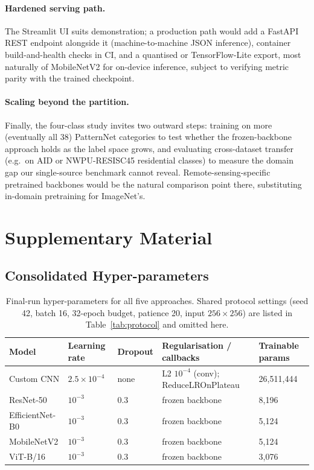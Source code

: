 \documentclass[11pt,twoside,a4paper]{article}
\begin{document}
\paragraph{Hardened serving path.}
The Streamlit UI suits demonstration; a production path would add a FastAPI
REST endpoint alongside it (machine-to-machine JSON inference), container
build-and-health checks in CI, and a quantised or TensorFlow-Lite export,
most naturally of MobileNetV2 for on-device inference, subject to
verifying metric parity with the trained checkpoint.

\paragraph{Scaling beyond the partition.}
Finally, the four-class study invites two outward steps: training on more
(eventually all 38) PatternNet categories to test whether the frozen-backbone
approach holds as the label space grows, and evaluating cross-dataset
transfer (e.g.\ on AID or NWPU-RESISC45 residential classes) to measure the
domain gap our single-source benchmark cannot reveal. Remote-sensing-specific
pretrained backbones would be the natural comparison point there,
substituting in-domain pretraining for ImageNet's.

\clearpage


\clearpage
\appendix
\section{Supplementary Material}

\subsection{Consolidated Hyper-parameters}

\begin{table}[H]
\centering
\caption{Final-run hyper-parameters for all five approaches. Shared protocol
settings (seed 42, batch 16, 32-epoch budget, patience 20, input
$256 \times 256$) are listed in Table~\ref{tab:protocol} and omitted here.}
\label{tab:appendix-hparams}
\small
\begin{tabular}{lllll}
\toprule
Model & Learning rate & Dropout & Regularisation / callbacks & Trainable params \\
\midrule
Custom CNN      & $2.5 \times 10^{-4}$ & none & L2 $10^{-4}$ (conv); ReduceLROnPlateau & 26{,}511{,}444 \\
ResNet-50       & $10^{-3}$ & 0.3 & frozen backbone & 8{,}196 \\
EfficientNet-B0 & $10^{-3}$ & 0.3 & frozen backbone & 5{,}124 \\
MobileNetV2     & $10^{-3}$ & 0.3 & frozen backbone & 5{,}124 \\
ViT-B/16        & $10^{-3}$ & 0.3 & frozen backbone & 3{,}076 \\
\bottomrule
\end{tabular}
\end{table}
\end{document}
